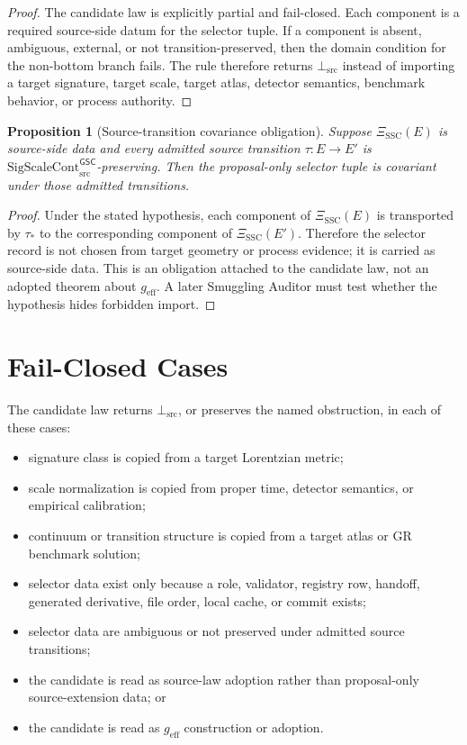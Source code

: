 \documentclass[11pt]{article}
\newcommand{\geff}{g_{\mathrm{eff}}}
\newcommand{\SigScaleCont}{\mathrm{SigScaleCont}_{\mathrm{src}}^{\mathsf{GSC}}}
\newcommand{\BottomSrc}{\bot_{\mathrm{src}}}
\newtheorem{proposition}{Proposition}
\begin{document}
\begin{proof}
The candidate law is explicitly partial and fail-closed. Each component is a
required source-side datum for the selector tuple. If a component is absent,
ambiguous, external, or not transition-preserved, then the domain condition
for the non-bottom branch fails. The rule therefore returns \(\BottomSrc\)
instead of importing a target signature, target scale, target atlas, detector
semantics, benchmark behavior, or process authority.
\end{proof}

\begin{proposition}[Source-transition covariance obligation]
Suppose \(\Xi_{\mathrm{SSC}}(E)\) is source-side data and every admitted source
transition \(\tau:E\to E'\) is \(\SigScaleCont\)-preserving. Then the
proposal-only selector tuple is covariant under those admitted transitions.
\end{proposition}

\begin{proof}
Under the stated hypothesis, each component of
\(\Xi_{\mathrm{SSC}}(E)\) is transported by \(\tau_{\ast}\) to the corresponding
component of \(\Xi_{\mathrm{SSC}}(E')\). Therefore the selector record is not
chosen from target geometry or process evidence; it is carried as source-side
data. This is an obligation attached to the candidate law, not an adopted
theorem about \(\geff\). A later Smuggling Auditor must test whether the
hypothesis hides forbidden import.
\end{proof}

\section{Fail-Closed Cases}

The candidate law returns \(\BottomSrc\), or preserves the named obstruction,
in each of these cases:
\begin{itemize}[leftmargin=*]
  \item signature class is copied from a target Lorentzian metric;
  \item scale normalization is copied from proper time, detector semantics, or
  empirical calibration;
  \item continuum or transition structure is copied from a target atlas or GR
  benchmark solution;
  \item selector data exist only because a role, validator, registry row,
  handoff, generated derivative, file order, local cache, or commit exists;
  \item selector data are ambiguous or not preserved under admitted source
  transitions;
  \item the candidate is read as source-law adoption rather than proposal-only
  source-extension data; or
  \item the candidate is read as \(\geff\) construction or adoption.
\end{itemize}
\end{document}
